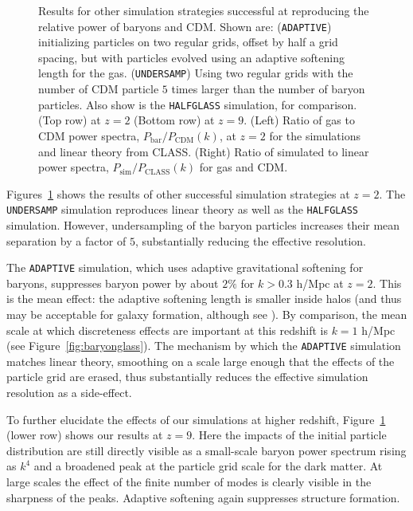 \documentclass[a4paper,11pt]{article}
\begin{document}
\begin{figure}
\caption{Results for other simulation strategies successful at reproducing the relative power of baryons and CDM. Shown are: (\texttt{ADAPTIVE}) initializing particles on two regular grids, offset by half a grid spacing, but with particles evolved using an adaptive softening length for the gas. (\texttt{UNDERSAMP}) Using two regular grids with the number of CDM particle $5$ times larger than the number of baryon particles. Also show is the \texttt{HALFGLASS} simulation, for comparison. (Top row) at $z=2$ (Bottom row) at $z=9$. (Left) Ratio of gas to CDM power spectra, $P_\mathrm{bar}/P_\mathrm{CDM}(k)$, at $z=2$ for the simulations and linear theory from CLASS. (Right) Ratio of simulated to linear power spectra, $P_\mathrm{sim}/P_\mathrm{CLASS}(k)$ for gas and CDM.}
  \label{fig:adaptive}
\end{figure}

Figures~\ref{fig:adaptive} shows the results of other successful simulation strategies at $z=2$. The \texttt{UNDERSAMP} simulation reproduces linear theory as well as the \texttt{HALFGLASS} simulation. However, undersampling of the baryon particles increases their mean separation by a factor of $5$, substantially reducing the effective resolution.

The \texttt{ADAPTIVE} simulation, which uses adaptive gravitational softening for baryons, suppresses baryon power by about $2\%$ for $k > 0.3$ h/Mpc at $z=2$. This is the mean effect: the adaptive softening length is smaller inside halos (and thus may be acceptable for galaxy formation, although see \cite{Fvdb:2018}). By comparison, the mean scale at which discreteness effects are important at this redshift is $k = 1$ h/Mpc (see Figure~\ref{fig:baryonglass}). The mechanism by which the \texttt{ADAPTIVE} simulation matches linear theory, smoothing on a scale large enough that the effects of the particle grid are erased, thus substantially reduces the effective simulation resolution as a side-effect.

To further elucidate the effects of our simulations at higher redshift, Figure~\ref{fig:adaptive} (lower row) shows our results at $z=9$. Here the impacts of the initial particle distribution are still directly visible as a small-scale baryon power spectrum rising as $k^4$ and a broadened peak at the particle grid scale for the dark matter. At large scales the effect of the finite number of modes is clearly visible in the sharpness of the peaks. Adaptive softening again suppresses structure formation.
\end{document}
